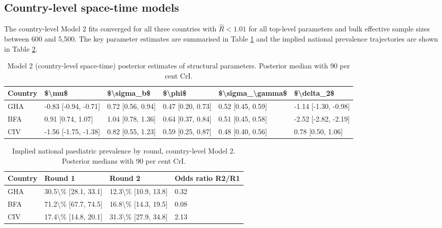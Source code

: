 \documentclass{article}
\begin{document}
\subsection{Country-level space-time
models}\label{country-level-space-time-models}

The country-level Model 2 fits converged for all three countries with
\(\hat{R} < 1.01\) for all top-level parameters and bulk effective
sample sizes between 600 and 5,500. The key parameter estimates are
summarised in Table \ref{tab:m2-params} and the implied national
prevalence trajectories are shown in Table \ref{tab:m2-prev}.

\begingroup\fontsize{8}{10}\selectfont

\begin{longtable}[t]{llllll}
\caption{\label{tab:m2-params}Model 2 (country-level space-time) posterior estimates of structural parameters. Posterior median with 90 per cent CrI. \label{tab:m2-params}}\\
\toprule
Country & \$\textbackslash{}mu\$ & \$\textbackslash{}sigma\_b\$ & \$\textbackslash{}phi\$ & \$\textbackslash{}sigma\_\textbackslash{}gamma\$ & \$\textbackslash{}delta\_2\$\\
\midrule
GHA & -0.83 [-0.94, -0.71] & 0.72 [0.56, 0.94] & 0.47 [0.20, 0.73] & 0.52 [0.45, 0.59] & -1.14 [-1.30, -0.98]\\
BFA & 0.91 [0.74, 1.07] & 1.04 [0.78, 1.36] & 0.64 [0.37, 0.84] & 0.51 [0.45, 0.58] & -2.52 [-2.82, -2.19]\\
CIV & -1.56 [-1.75, -1.38] & 0.82 [0.55, 1.23] & 0.59 [0.25, 0.87] & 0.48 [0.40, 0.56] & 0.78 [0.50, 1.06]\\
\bottomrule
\end{longtable}
\endgroup{}

\begingroup\fontsize{8}{10}\selectfont

\begin{longtable}[t]{llll}
\caption{\label{tab:m2-prev}Implied national paediatric prevalence by round, country-level Model 2. Posterior medians with 90 per cent CrI. \label{tab:m2-prev}}\\
\toprule
Country & Round 1 & Round 2 & Odds ratio R2/R1\\
\midrule
GHA & 30.5\textbackslash{}\% [28.1, 33.1] & 12.3\textbackslash{}\% [10.9, 13.8] & 0.32\\
BFA & 71.2\textbackslash{}\% [67.7, 74.5] & 16.8\textbackslash{}\% [14.3, 19.5] & 0.08\\
CIV & 17.4\textbackslash{}\% [14.8, 20.1] & 31.3\textbackslash{}\% [27.9, 34.8] & 2.13\\
\bottomrule
\end{longtable}
\endgroup{}
\end{document}
